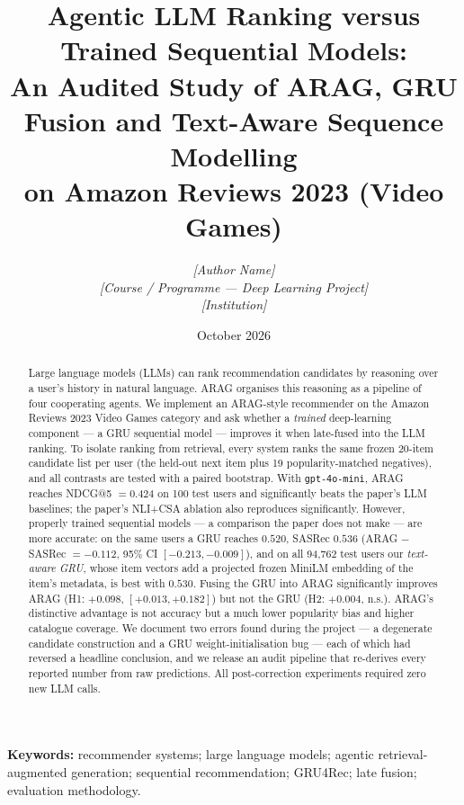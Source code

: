 \documentclass[11pt,a4paper]{article}
\title{\textbf{Agentic LLM Ranking versus Trained Sequential Models:\\
An Audited Study of ARAG, GRU Fusion and Text-Aware Sequence Modelling\\
on Amazon Reviews 2023 (Video Games)}}
\author{%
  \textit{[Author Name]}\\
  \textit{[Course / Programme --- Deep Learning Project]}\\
  \textit{[Institution]}}
\date{October 2026}
\begin{document}
\maketitle

\begin{abstract}
\noindent Large language models (LLMs) can rank recommendation candidates by reasoning over a
user's history in natural language. ARAG \citep{maragheh2025arag} organises this reasoning as a
pipeline of four cooperating agents. We implement an ARAG-style recommender on the Amazon
Reviews 2023 Video Games category \citep{hou2024bridging} and ask whether a \emph{trained}
deep-learning component --- a GRU sequential model \citep{hidasi2016session} --- improves it
when late-fused into the LLM ranking. To isolate ranking from retrieval, every system ranks the
same frozen 20-item candidate list per user (the held-out next item plus 19
popularity-matched negatives), and all contrasts are tested with a paired bootstrap.
With \texttt{gpt-4o-mini}, ARAG reaches NDCG@5 $=0.424$ on 100 test users and significantly
beats the paper's LLM baselines; the paper's NLI+CSA ablation also reproduces significantly.
However, properly trained sequential models --- a comparison the paper does not make --- are
more accurate: on the same users a GRU reaches $0.520$, SASRec \citep{kang2018self} $0.536$
(ARAG $-$ SASRec $=-0.112$, 95\% CI $[-0.213,-0.009]$), and on all 94{,}762 test users our
\emph{text-aware GRU}, whose item vectors add a projected frozen MiniLM embedding of the item's
metadata, is best with $0.530$. Fusing the GRU into ARAG significantly improves ARAG
(H1: $+0.098$, $[+0.013,+0.182]$) but not the GRU (H2: $+0.004$, n.s.). ARAG's distinctive
advantage is not accuracy but a much lower popularity bias and higher catalogue coverage. We
document two errors found during the project --- a degenerate candidate construction and a GRU
weight-initialisation bug --- each of which had reversed a headline conclusion, and we release
an audit pipeline that re-derives every reported number from raw predictions. All
post-correction experiments required zero new LLM calls.
\end{abstract}

\noindent\textbf{Keywords:} recommender systems; large language models; agentic retrieval-augmented
generation; sequential recommendation; GRU4Rec; late fusion; evaluation methodology.

\tableofcontents
\newpage
\end{document}
